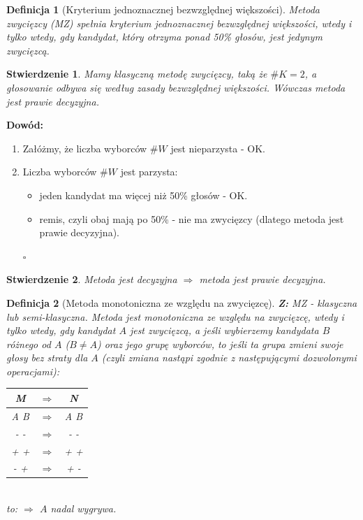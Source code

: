 \documentclass[12pt,a4paper]{article}
\newcounter{twierdzenie}
\theoremstyle{break}
\newtheorem{definition}{Definicja}[section]
\newtheorem{stwierdzenie}{Stwierdzenie}[section]
\begin{document}
	\begin{definition}[Kryterium jednoznacznej bezwzględnej większości]
		Metoda zwycięzcy (MZ) spełnia kryterium jednoznacznej bezwzględnej większości, \textit{wtedy i tylko wtedy}, gdy kandydat, który otrzyma ponad 50\% głosów, jest jedynym zwycięzcą.
	\end{definition}
	
	\begin{stwierdzenie}
		Mamy klasyczną metodę zwycięzcy, taką że $\# K=2$, a głosowanie odbywa się według zasady bezwzględnej większości. Wówczas metoda jest prawie decyzyjna.
	\end{stwierdzenie}
	
	\noindent \textbf{Dowód:}
	\begin{enumerate}[1$^\circ$]
		\item Załóżmy, że liczba wyborców $\# W$ jest nieparzysta - OK.
		\item Liczba wyborców $\# W$ jest parzysta:
		\begin{itemize}
			\item jeden kandydat ma więcej niż 50\% głosów - OK.
			\item remis, czyli obaj mają po 50\% - nie ma zwycięzcy (dlatego metoda jest prawie decyzyjna).
		\end{itemize}
		\begin{flushright}$\square$\end{flushright}
	\end{enumerate} 
	
	\begin{stwierdzenie}
		Metoda jest decyzyjna $\Rightarrow$ metoda jest prawie decyzyjna.
	\end{stwierdzenie}
	
	\begin{definition}[Metoda monotoniczna ze względu na zwycięzcę]
		\textbf{Z:} MZ - klasyczna lub semi-klasyczna.
		Metoda jest monotoniczna ze względu na zwycięzcę, \textit{wtedy i tylko wtedy}, gdy kandydat $A$ jest zwycięzcą, a jeśli wybierzemy kandydata $B$ różnego od $A$ ($B\neq A$) oraz jego grupę wyborców, to jeśli ta grupa zmieni swoje głosy bez straty dla $A$ (czyli zmiana nastąpi zgodnie z następującymi dozwolonymi operacjami):\\
		
		\begin{tabular}{|c|c|c|}
			\hline
			M & $\Rightarrow$ & N \\\hline
			A B & $\Rightarrow$ & A B \\\hline
			- - & $\Rightarrow$ & - - \\\hline
			+ + & $\Rightarrow$ & + + \\\hline
			- + & $\Rightarrow$ & + - \\\hline
		\end{tabular}\\
		
		to: $\Rightarrow$ $A$ nadal wygrywa.
	\end{definition}
	
\end{document}
